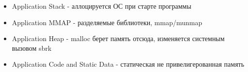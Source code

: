 \begin{frame}
\begin{columns}[T]
  \begin{column}{.6\textwidth}
    \begin{itemize}
      \item Application Stack - аллоцируется ОС при старте программы
      \item Application MMAP - разделяемые библиотеки, mmap/munmap
      \item Application Heap - malloc берет память отсюда, изменяется системным вызовом sbrk
      \item Application Code and Static Data - статическая не привелигерованная память
    \end{itemize}
  \end{column}
\end{columns}

\end{frame}

